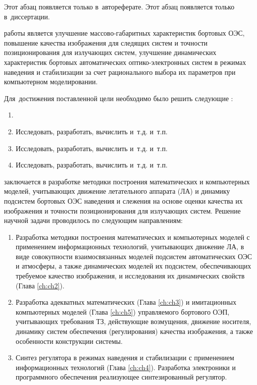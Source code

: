 \ifsynopsis
Этот абзац появляется только в~автореферате.
\else
Этот абзац появляется только в~диссертации.
\fi


{\aim} работы является улучшение массово-габаритных характеристик бортовых ОЭС, повышение качества изображения для следящих систем и точности позиционирования для излучающих систем, улучшение динамических характеристик бортовых автоматических оптико-электронных систем в режимах наведения и стабилизации за счет рационального выбора их параметров при компьютерном моделировании.

Для~достижения поставленной цели необходимо было решить следующие {\tasks}:
\begin{enumerate}
  \item {}
  \item Исследовать, разработать, вычислить и~т.\:д. и~т.\:п.
  \item Исследовать, разработать, вычислить и~т.\:д. и~т.\:п.
  \item Исследовать, разработать, вычислить и~т.\:д. и~т.\:п.
\end{enumerate}


{\novelty} заключается в разработке методики построения математических и компьютерных моделей, учитывающих движение летательного аппарата (ЛА) и динамику подсистем бортовых ОЭС наведения и слежения на основе оценки качества их изображения и точности позиционирования для излучающих систем. Решение научной задачи проводилось по следующим направлениям:
\begin{enumerate}
  \item Разработка методики построения математических и компьютерных моделей с применением информационных технологий, учитывающих движение ЛА, в виде совокупности взаимосвязанных моделей подсистем автоматических ОЭС и атмосферы, а также динамических моделей их подсистем, обеспечивающих требуемое качество изображения, и исследования их динамических свойств (Глава \ref{ch:ch2}). 
  \item Разработка адекватных математических (Глава \ref{ch:ch3}) и имитационных компьютерных моделей (Глава \ref{ch:ch5}) управляемого бортового ОЭП, учитывающих требования ТЗ, действующие возмущения, движение носителя, динамику систем обеспечения (регулирования) качества изображения, а также особенности конструкции системы. 
  \item Синтез регулятора в режимах наведения и стабилизации с применением информационных технологий (Глава \ref{ch:ch4}). Разработка электроники и программного обеспечения реализующее синтезированный регулятор.
\end{enumerate}

